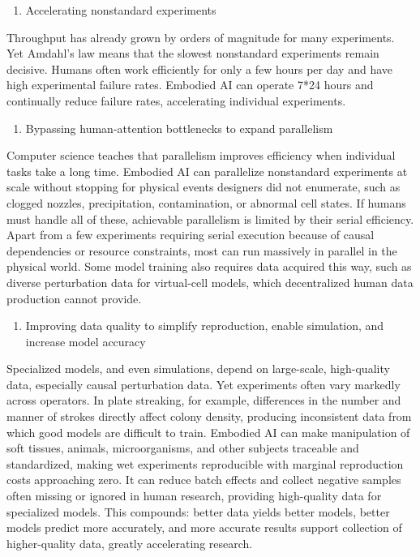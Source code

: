 \begin{enumerate}
\def\labelenumi{\arabic{enumi}.}
\setcounter{enumi}{1}
\tightlist
\item
  Accelerating nonstandard experiments
\end{enumerate}

Throughput has already grown by orders of magnitude for many experiments. Yet Amdahl's law means that the slowest nonstandard experiments remain decisive. Humans often work efficiently for only a few hours per day and have high experimental failure rates. Embodied AI can operate 7*24 hours and continually reduce failure rates, accelerating individual experiments.

\begin{enumerate}
\def\labelenumi{\arabic{enumi}.}
\setcounter{enumi}{2}
\tightlist
\item
  Bypassing human-attention bottlenecks to expand parallelism
\end{enumerate}

Computer science teaches that parallelism improves efficiency when individual tasks take a long time. Embodied AI can parallelize nonstandard experiments at scale without stopping for physical events designers did not enumerate, such as clogged nozzles, precipitation, contamination, or abnormal cell states. If humans must handle all of these, achievable parallelism is limited by their serial efficiency. Apart from a few experiments requiring serial execution because of causal dependencies or resource constraints, most can run massively in parallel in the physical world. Some model training also requires data acquired this way, such as diverse perturbation data for virtual-cell models, which decentralized human data production cannot provide.

\begin{enumerate}
\def\labelenumi{\arabic{enumi}.}
\setcounter{enumi}{3}
\tightlist
\item
  Improving data quality to simplify reproduction, enable simulation, and increase model accuracy
\end{enumerate}

Specialized models, and even simulations, depend on large-scale, high-quality data, especially causal perturbation data. Yet experiments often vary markedly across operators. In plate streaking, for example, differences in the number and manner of strokes directly affect colony density, producing inconsistent data from which good models are difficult to train. Embodied AI can make manipulation of soft tissues, animals, microorganisms, and other subjects traceable and standardized, making wet experiments reproducible with marginal reproduction costs approaching zero. It can reduce batch effects and collect negative samples often missing or ignored in human research, providing high-quality data for specialized models. This compounds: better data yields better models, better models predict more accurately, and more accurate results support collection of higher-quality data, greatly accelerating research.


